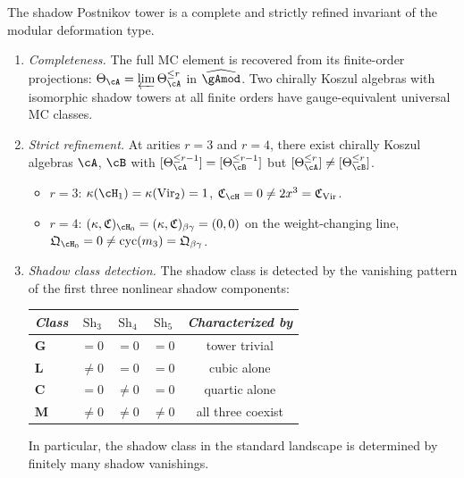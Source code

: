 \begin{theorem}
\label{thm:shadow-separation}
\ClaimStatusProvedHere
{}
The shadow Postnikov tower is a complete and strictly refined
invariant of the modular deformation type.
\begin{enumerate}[label=\textup{(\roman*)}]
\item \emph{Completeness.}
  The full MC element is recovered from its finite-order
  projections:
  $\Theta_\cA = \varprojlim \Theta_\cA^{\leq r}$
  in $\widehat{\gAmod}$.
  Two chirally Koszul algebras with isomorphic shadow towers
  at all finite orders have gauge-equivalent universal MC
  classes.

\item \emph{Strict refinement.}
  At arities $r = 3$ and $r = 4$, there exist chirally
  Koszul algebras $\cA$, $\cB$ with
  $[\Theta_\cA^{\leq r-1}] = [\Theta_\cB^{\leq r-1}]$
  but $[\Theta_\cA^{\leq r}] \neq [\Theta_\cB^{\leq r}]$.
  \begin{itemize}
  \item $r = 3$:
    $\kappa(\cH_1) = \kappa(\mathrm{Vir}_2) = 1$,\;
    $\mathfrak{C}_{\cH} = 0 \neq 2x^3 =
    \mathfrak{C}_{\mathrm{Vir}}$.
  \item $r = 4$:
    $(\kappa, \mathfrak{C})_{\cH_0} =
    (\kappa, \mathfrak{C})_{\beta\gamma} = (0, 0)$
    on the weight-changing line,\;
    $\mathfrak{Q}_{\cH_0} = 0 \neq
    \operatorname{cyc}(m_3)
    = \mathfrak{Q}_{\beta\gamma}$.
  \end{itemize}

\item \emph{Shadow class detection.}
  The shadow class is detected by the vanishing pattern of
  the first three nonlinear shadow components:
  \begin{center}
  \small
  \renewcommand{\arraystretch}{1.1}
  \begin{tabular}{@{}lcccc@{}}
  \toprule
  \emph{Class}
    & $\mathrm{Sh}_3$ & $\mathrm{Sh}_4$ & $\mathrm{Sh}_5$
    & \emph{Characterized by} \\
  \midrule
  $\mathbf{G}$
    & $= 0$ & $= 0$ & $= 0$
    & tower trivial \\
  $\mathbf{L}$
    & $\neq 0$ & $= 0$ & $= 0$
    & cubic alone \\
  $\mathbf{C}$
    & $= 0$ & $\neq 0$ & $= 0$
    & quartic alone \\
  $\mathbf{M}$
    & $\neq 0$ & $\neq 0$ & $\neq 0$
    & all three coexist \\
  \bottomrule
  \end{tabular}
  \end{center}
  In particular, the shadow class in the standard landscape
  is determined by finitely many shadow vanishings.
\end{enumerate}
\end{theorem}

